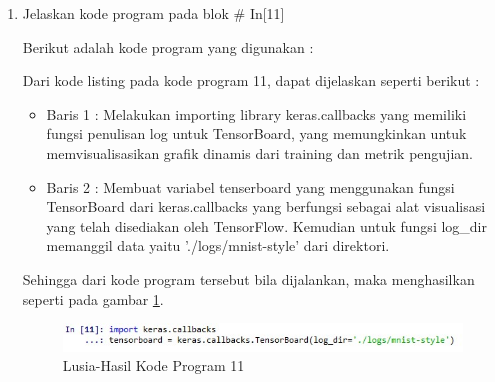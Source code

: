 \begin{enumerate}
\item Jelaskan kode program pada blok \# In[11]
	\par Berikut adalah kode program yang digunakan :
	
	\par Dari kode listing pada kode program 11, dapat dijelaskan seperti berikut :
	\begin{itemize}
	\item Baris 1	: Melakukan importing library keras.callbacks yang memiliki fungsi penulisan log untuk TensorBoard, yang memungkinkan untuk memvisualisasikan grafik dinamis dari training dan metrik pengujian.
	\item Baris 2	: Membuat variabel tenserboard yang menggunakan fungsi TensorBoard dari keras.callbacks yang berfungsi sebagai alat visualisasi yang telah disediakan oleh TensorFlow. Kemudian untuk fungsi log\_dir memanggil data yaitu './logs/mnist-style' dari direktori.
	\end{itemize}
	\par Sehingga dari kode program tersebut bila dijalankan, maka menghasilkan seperti pada gambar \ref{7B11}.
		\begin{figure}[!hbtp]
		\centering
		\includegraphics[scale=0.5]{figures/w11.jpg}
		\caption{Lusia-Hasil Kode Program 11}
		\label{7B11}
		\end{figure}


\end{enumerate}
